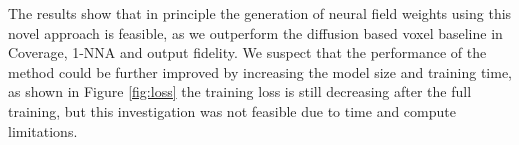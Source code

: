 

The results show that in principle the generation of neural field weights using this novel approach is feasible, as we outperform the diffusion based voxel baseline in Coverage, 1-NNA and output fidelity. We suspect that the performance of the method could be further improved by increasing the model size and training time, as shown in Figure \ref{fig:loss} the training loss is still decreasing after the full training, but this investigation was not feasible due to time and compute limitations.


